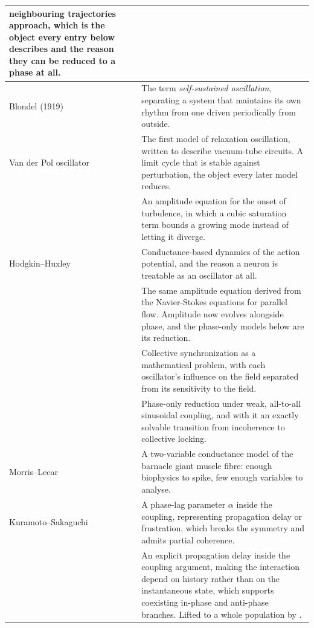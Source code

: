 \documentclass[a4paper,fleqn]{cas-sc}
\begin{document}
\begin{longtable}[]{@{}
  >{\raggedright\arraybackslash}p{}
  >{\raggedright\arraybackslash}p{}@{}}
neighbouring trajectories approach, which is the object every entry
below describes and the reason they can be reduced to a phase at all. \\
\cmidrule{1-2}Blondel (1919) & The term \emph{self-sustained
oscillation}, separating a system that maintains its own rhythm from one
driven periodically from outside. \\
\cmidrule{1-2}Van der Pol oscillator \citep{vanderpol1926} & The first
model of relaxation oscillation, written to describe vacuum-tube
circuits. A limit cycle that is stable against perturbation, the object
every later model reduces. \\
\cmidrule{1-2}\citet{landau1944} & An amplitude equation for the onset
of turbulence, in which a cubic saturation term bounds a growing mode
instead of letting it diverge. \\
\cmidrule{1-2}Hodgkin--Huxley \citep{hodgkin1952} & Conductance-based
dynamics of the action potential, and the reason a neuron is treatable
as an oscillator at all. \\
\cmidrule{1-2}\citet{stuart1960} & The same amplitude equation derived
from the Navier-Stokes equations for parallel flow. Amplitude now
evolves alongside phase, and the phase-only models below are its
reduction. \\
\cmidrule{1-2}\citet{winfree1967} & Collective synchronization as a
mathematical problem, with each oscillator's influence on the field
separated from its sensitivity to the field. \\
\cmidrule{1-2}\citet{kuramoto1975} & Phase-only reduction under weak,
all-to-all sinusoidal coupling, and with it an exactly solvable
transition from incoherence to collective locking. \\
\cmidrule{1-2}Morris--Lecar \citep{morris1981} & A two-variable
conductance model of the barnacle giant muscle fibre: enough biophysics
to spike, few enough variables to analyse. \\
\cmidrule{1-2}Kuramoto--Sakaguchi \citep{sakaguchi1986} & A phase-lag
parameter \ensuremath{\alpha} inside the coupling, representing
propagation delay or frustration, which breaks the symmetry and admits
partial coherence. \\
\cmidrule{1-2}\citet{schuster1989} & An explicit propagation delay
inside the coupling argument, making the interaction depend on history
rather than on the instantaneous state, which supports coexisting
in-phase and anti-phase branches. Lifted to a whole population by
\citet{yeung1999}. \\

\end{longtable}
\end{document}
